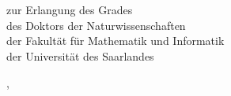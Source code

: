 \begin{titlepage}
    \begin{addmargin}[-1cm]{-3cm}
    \begin{center}
        \large

        \hfill

        \vfill

        \begingroup
            \color{CTtitle}\spacedallcaps{\myTitle} \\ \bigskip
        \endgroup

        \spacedlowsmallcaps{\myName}

        \vfill

	    \\
	    \bigskip
	    zur  Erlangung  des  Grades\\
	    des  Doktors  der Naturwissenschaften\\
	    der Fakultät für Mathematik und Informatik\\
	    der Universität des Saarlandes
        \bigskip

        \myLocation, \myTime

        \vfill

    \end{center}
  \end{addmargin}
\end{titlepage}
